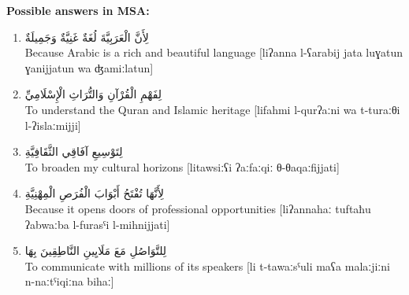 \documentclass[letterpaper,12pt]{article}
\begin{document}
\begin{tcolorbox}[colback=white,colframe=dialectcolor,breakable]
\textbf{Possible answers in MSA:}

\begin{enumerate}
\item \textarabic{لِأَنَّ الْعَرَبِيَّةَ لُغَةٌ غَنِيَّةٌ وَجَمِيلَةٌ}\\
Because Arabic is a rich and beautiful language [liʔanna l-ʕarabij jata luɣatun ɣanijjatun wa ʤamiːlatun]

\item \textarabic{لِفَهْمِ الْقُرْآنِ وَالتُّرَاثِ الْإِسْلَامِيِّ}\\
To understand the Quran and Islamic heritage [lifahmi l-qurʔaːni wa t-turaːθi l-ʔislaːmijji]

\item \textarabic{لِتَوْسِيعِ آفَاقِي الثَّقَافِيَّةِ}\\
To broaden my cultural horizons [litawsiːʕi ʔaːfaːqiː θ-θaqaːfijjati]

\item \textarabic{لِأَنَّهَا تُفْتَحُ أَبْوَابَ الْفُرَصِ الْمِهْنِيَّةِ}\\
Because it opens doors of professional opportunities [liʔannahaː tuftaħu ʔabwaːba l-furasˤi l-mihnijjati]

\item \textarabic{لِلتَّوَاصُلِ مَعَ مَلَايِينِ النَّاطِقِينَ بِهَا}\\
To communicate with millions of its speakers [li t-tawaːsˤuli maʕa malaːjiːni n-naːtˤiqiːna bihaː]
\end{enumerate}
\end{tcolorbox}
\end{document}
